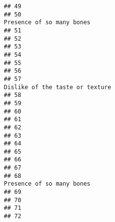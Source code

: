 \documentclass[
]{article}
\begin{document}
\begin{verbatim}
## 49                                                                                                         
## 50                                                                                Presence of so many bones
## 51                                                                                                         
## 52                                                                                                         
## 53                                                                                                         
## 54                                                                                                         
## 55                                                                                                         
## 56                                                                                                         
## 57                                                                          Dislike of the taste or texture
## 58                                                                                                         
## 59                                                                                                         
## 60                                                                                                         
## 61                                                                                                         
## 62                                                                                                         
## 63                                                                                                         
## 64                                                                                                         
## 65                                                                                                         
## 66                                                                                                         
## 67                                                                                                         
## 68                                                                                Presence of so many bones
## 69                                                                                                         
## 70                                                                                                         
## 71                                                                                                         
## 72                                                                                                         

\end{verbatim}
\end{document}
